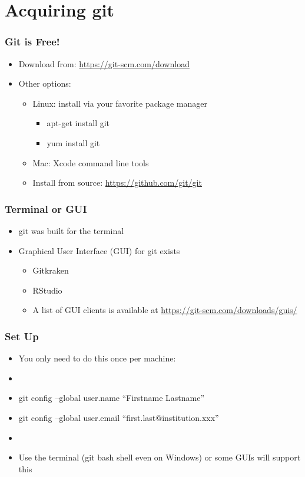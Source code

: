 \section{Acquiring git}
\begin{frame}
  \frametitle{Git is Free!}

  \begin{itemize}
    \item Download from: \url{https://git-scm.com/download}

    \item Other options:

    \begin{itemize}
      \item Linux: install via your favorite package manager
        \begin{itemize}
          \item apt-get install git
          \item yum install git
        \end{itemize}
      \item Mac: Xcode command line tools
      \item Install from source: \url{https://github.com/git/git}
    \end{itemize}
  \end{itemize}
\end{frame}

\begin{frame}
  \frametitle{Terminal or GUI}
  \begin{itemize}
    \item git was built for the terminal
    \item Graphical User Interface (GUI) for git exists
      \begin{itemize}
        \item Gitkraken
        \item RStudio
        \item A list of GUI clients is available at \url{https://git-scm.com/downloads/guis/}
      \end{itemize}
  \end{itemize}
\end{frame}

\begin{frame}
  \frametitle{Set Up}

  \begin{itemize}
    \item You only need to do this once per machine:
    \item[]
    \item[] git config --global user.name ``Firstname Lastname''
    \item[] git config --global user.email ``first.last@institution.xxx''
    \item[]
    \item Use the terminal (git bash shell even on Windows) or some GUIs will
      support this
  \end{itemize}

\end{frame}
